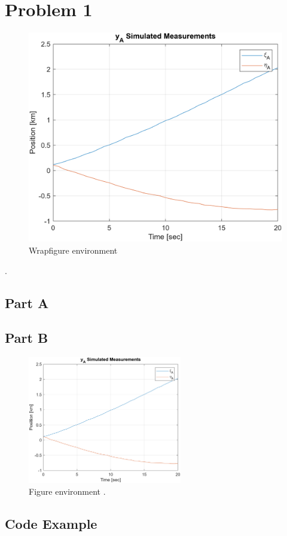 
\section{Problem 1}
%
\begin{figure}
    \begin{center}
        \includegraphics[width=0.8\linewidth]{figs/p2pa.png}
    \end{center}
    \caption{Wrapfigure environment}
\end{figure}
%
\lipsum[26] \cite{fouhey_2010MachineLearning_2018}.
\lipsum[55]
%
\subsection{Part A}
\begin{remark}[test]
    \lipsum[55]
\end{remark}
%
\lipsum[23]
%
\begin{definition}[test]
    \lipsum[44]
\end{definition}
%
\lipsum[32]
%
\subsection{Part B}
%
\begin{figure}[h!tbp]
    \centering
    \includegraphics[width=0.6\textwidth]{figs/p2pa.png}
    \caption{Figure environment \cite{galvez_MachinelearningDataSet_2019}.}
    \label{fig:p2_a}
\end{figure}
%
\begin{theorem}[test]
    \lipsum[2]
\end{theorem}
%
\lipsum[34]
%
\begin{eg}[test]
    \lipsum[36]
\end{eg}
%
\subsection{Code Example}
\inputminted{python3}{code/code_ex.py}